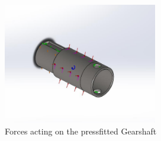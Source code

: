 \begin{figure}[H]
\centering
\includegraphics[width=0.6\textwidth]{texfiles/mech/eimg/propulsion/picture_forces_gearshaft_right}
\caption{Forces acting on the pressfitted Gearshaft}
\label{fig:gearshaft_right_forces}
\end{figure}


